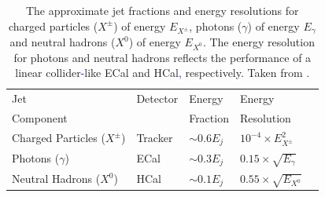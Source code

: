 \begin{table}[h!]
\centering
\begin{tabular}{ l l l l l}
\hline
Jet  & Detector & Energy & Energy\\
Component &  & Fraction & Resolution\\
\hline
Charged Particles ($X^{\pm}$) & Tracker & $\sim 0.6 E_{j}$ & $10^{-4} \times E_{X^{\pm}}^{2}$ \\
Photons ($\gamma$) & ECal & $\sim 0.3 E_{j}$ & $0.15 \times \sqrt{E_{\gamma}}$ \\
Neutral Hadrons ($X^{0}$) & HCal &$\sim 0.1 E_{j}$ & $0.55 \times \sqrt{E_{X^{0}}}$ \\
\hline
\end{tabular}
\caption[The approximate jet fractions and energy resolutions for charged particles ($X^{\pm}$) of energy $E_{X^{\pm}}$, photons ($\gamma$) of energy $E_{\gamma}$ and neutral hadrons ($X^{0}$) of energy $E_{X^{0}}$.  The energy resolution for photons and neutral hadrons reflects the performance of a linear collider\textcolor{blue}{-}like ECal and HCal\textcolor{blue}{,} respectively.  Taken from \cite{arXiv:0907.3577}.]{The approximate jet fractions and energy resolutions for charged particles ($X^{\pm}$) of energy $E_{X^{\pm}}$, photons ($\gamma$) of energy $E_{\gamma}$ and neutral hadrons ($X^{0}$) of energy $E_{X^{0}}$.  The energy resolution for photons and neutral hadrons reflects the performance of a linear collider\textcolor{blue}{-}like ECal and HCal\textcolor{blue}{,} respectively.  Taken from \cite{arXiv:0907.3577}.}
\label{table:pflowjet}
\end{table}

